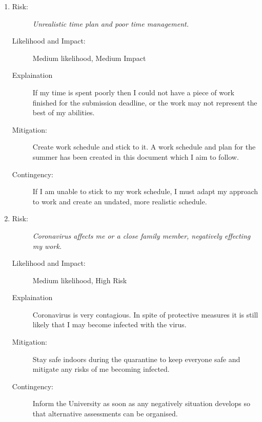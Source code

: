 \documentclass{article}
\begin{document}

\begin{enumerate}
    \item 
    \begin{description}
        \item[Risk:]    
        \emph{Unrealistic time plan and poor time management.}
        \item[Likelihood and Impact:]
        Medium likelihood, Medium Impact
        \item[Explaination]
        If my time is spent poorly then I could not have a piece of work finished for the submission deadline, or the work may not represent the best of my abilities.  
        \item[Mitigation:]
        Create work schedule and stick to it.
        A work schedule and plan for the summer has been created in this document which I aim to follow.
        \item[Contingency:]
        If I am unable to stick to my work schedule, I must adapt my approach to work and create an undated, more realistic schedule.
    \end{description}

    \item 
    \begin{description}
        \item[Risk:]
        \emph{Coronavirus affects me or a close family member, negatively effecting my work.}
        \item[Likelihood and Impact:]
        Medium likelihood, High Risk
        \item[Explaination]
        Coronavirus is very contagious. 
        In spite of protective measures it is still likely that I may become infected with the virus. 
        \item[Mitigation:]
        Stay safe indoors during the quarantine to keep everyone safe and mitigate any risks of me becoming infected.
        \item[Contingency:]
        Inform the University as soon as any negatively situation develops so that alternative assessments can be organised.
    \end{description}


\end{enumerate}
\end{document}
